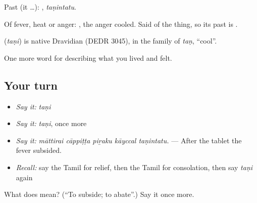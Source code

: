 Past (it …): , \emph{taṇintatu}.

Of fever, heat or anger:  , the anger cooled. Said of the thing, so its past is .

\begin{cousinweb}
\textbf{} (\emph{taṇi}) is native Dravidian (DEDR 3045), in the family of  \emph{taṇ}, \textquotedblleft{}cool\textquotedblright{}.
\end{cousinweb}

\begin{grammarlens}[title={What you've built}]
One more word for describing what you lived and felt.
\end{grammarlens}

\subsection*{Your turn}
\begin{itemize}
\raggedright
  \item \emph{Say it:} \emph{taṇi}
  \item \emph{Say it:} \emph{taṇi}, once more
  \item \emph{Say it:} \emph{māttirai cāppiṭṭa piṟaku kāyccal taṇintatu.} — After the tablet the fever subsided.
  \item \emph{Recall:} say the Tamil for relief, then the Tamil for consolation, then say \emph{taṇi} again
\end{itemize}

\begin{tcolorbox}[breakable,colback=teal!4,colframe=teal!35!black,title={Before you move on}]
What does  mean? (\textquotedblleft{}To subside; to abate\textquotedblright{}.) Say it once more.
\end{tcolorbox}
